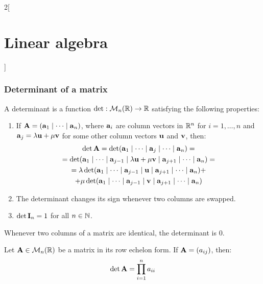 \documentclass[../../../main.tex]{subfiles}
\begin{document}
\begin{multicols}{2}[\section{Linear algebra}]
    \subsubsection*{Determinant of a matrix}
    \begin{definition}[Determinant]
        A determinant is a function $\det:\mathcal{M}_n(\mathbb{R})\rightarrow\mathbb{R}$ satisfying the following properties:
        \begin{enumerate}
            \item If $\boldsymbol{\mathrm{A}}=(\boldsymbol{\mathrm{a}}_1\mid\cdots\mid \boldsymbol{\mathrm{a}}_n)$, where $\boldsymbol{\mathrm{a}}_i$ are column vectors in $\mathbb{R}^n$ for $i=1,\ldots,n$ and $\boldsymbol{\mathrm{a}}_j=\lambda\boldsymbol{\mathrm{u}}+\mu\boldsymbol{\mathrm{v}}$ for some other column vectors $\boldsymbol{\mathrm{u}}$ and $\boldsymbol{\mathrm{v}}$, then:
                  \begin{multline*}
                      \det \boldsymbol{\mathrm{A}}=\det(\boldsymbol{\mathrm{a}}_1\mid\cdots\mid\boldsymbol{\mathrm{a}}_j\mid\cdots\mid \boldsymbol{\mathrm{a}}_n)=\\=\det(\boldsymbol{\mathrm{a}}_1\mid\cdots\mid \boldsymbol{\mathrm{a}}_{j-1}\mid\lambda \boldsymbol{\mathrm{u}}+\mu \boldsymbol{\mathrm{v}}\mid \boldsymbol{\mathrm{a}}_{j+1}\mid\cdots\mid \boldsymbol{\mathrm{a}}_n)=\\=\lambda\det(\boldsymbol{\mathrm{a}}_1\mid\cdots\mid \boldsymbol{\mathrm{a}}_{j-1}\mid \boldsymbol{\mathrm{u}}\mid \boldsymbol{\mathrm{a}}_{j+1}\mid\cdots\mid \boldsymbol{\mathrm{a}}_n)+\\+\mu\det(\boldsymbol{\mathrm{a}}_1\mid\cdots\mid \boldsymbol{\mathrm{a}}_{j-1}\mid \boldsymbol{\mathrm{v}}\mid \boldsymbol{\mathrm{a}}_{j+1}\mid\cdots\mid \boldsymbol{\mathrm{a}}_n)
                  \end{multline*}
            \item The determinant changes its sign whenever two columns are swapped.
            \item $\det \boldsymbol{\mathrm{I}}_n=1$ for all $n\in\mathbb{N}$.
        \end{enumerate}
    \end{definition}
    \begin{lemma}
        Whenever two columns of a matrix are identical, the determinant is 0.
    \end{lemma}
    \begin{prop}
        Let $\boldsymbol{\mathrm{A}}\in\mathcal{M}_n(\mathbb{R})$ be a matrix in its row echelon form. If $\boldsymbol{\mathrm{A}}=(a_{ij})$, then: $$\det\boldsymbol{\mathrm{A}}=\prod_{i=1}^na_{ii}$$
    \end{prop}
    \begin{prop}

\end{prop}
\end{multicols}
\end{document}
